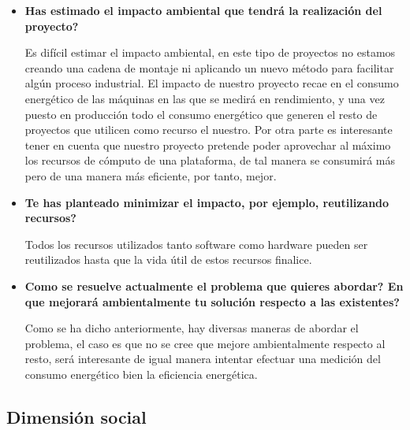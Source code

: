 \begin{itemize}
 \item \textbf{Has estimado el impacto ambiental que tendrá la realización del proyecto?}\newline
 
 Es difícil estimar el impacto ambiental, en este tipo de proyectos no estamos creando una cadena de montaje ni aplicando un nuevo método para facilitar algún proceso industrial. El impacto de nuestro proyecto recae en el consumo energético de las máquinas en las que se medirá en rendimiento, y una vez puesto en producción todo el consumo energético que generen el resto de proyectos que utilicen como recurso el nuestro. Por otra parte es interesante tener en cuenta que nuestro proyecto pretende poder aprovechar al máximo los recursos de cómputo de una plataforma, de tal manera se consumirá más pero de una manera más eficiente, por tanto, mejor.
 
 \item \textbf{Te has planteado minimizar el impacto, por ejemplo, reutilizando recursos?}\newline
 
 Todos los recursos utilizados tanto software como hardware pueden ser reutilizados hasta que la vida útil de estos recursos finalice.
 
 \item \textbf{Como se resuelve actualmente el problema que quieres abordar? En que mejorará ambientalmente tu solución respecto a las existentes?}\newline
 
Como se ha dicho anteriormente, hay diversas maneras de abordar el problema, el caso es que no se cree que mejore ambientalmente respecto al resto, será interesante de igual manera intentar efectuar una medición del consumo energético  bien la eficiencia energética.
\end{itemize}

\subsection{Dimensión social}

